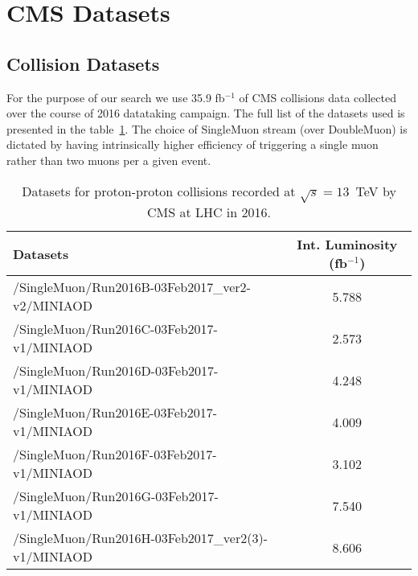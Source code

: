 \section{CMS Datasets} \label{section:higgs_data}

\subsection{Collision Datasets}
For the purpose of our search we use 35.9 fb$^{-1}$ of CMS collisions data collected over the course of 2016 datataking campaign. The full list of the datasets used is presented in the table~\ref{table:higgs_data_collisiondatasets}. The choice of SingleMuon stream (over DoubleMuon) is dictated by having intrinsically higher efficiency of triggering a single muon rather than two muons per a given event.
\begin{table}
    \caption{Datasets for proton-proton collisions recorded at $\sqrt{s}=13$~TeV by CMS at LHC in 2016.}
    \label{table:higgs_data_collisiondatasets}
    \begin{center}
        \begin{tabular}{ l  c}
            \hline
            Datasets & Int. Luminosity (fb$^{-1}$)\\
            \hline
            {/SingleMuon/Run2016B-03Feb2017\_ver2-v2/MINIAOD} & 5.788\\
            {/SingleMuon/Run2016C-03Feb2017-v1/MINIAOD} & 2.573\\
            {/SingleMuon/Run2016D-03Feb2017-v1/MINIAOD} & 4.248\\
            {/SingleMuon/Run2016E-03Feb2017-v1/MINIAOD} & 4.009\\
            {/SingleMuon/Run2016F-03Feb2017-v1/MINIAOD} & 3.102\\
            {/SingleMuon/Run2016G-03Feb2017-v1/MINIAOD} & 7.540\\
            {/SingleMuon/Run2016H-03Feb2017\_ver2(3)-v1/MINIAOD} & 8.606\\
            \hline
        \end{tabular}
    \end{center}
\end{table}

